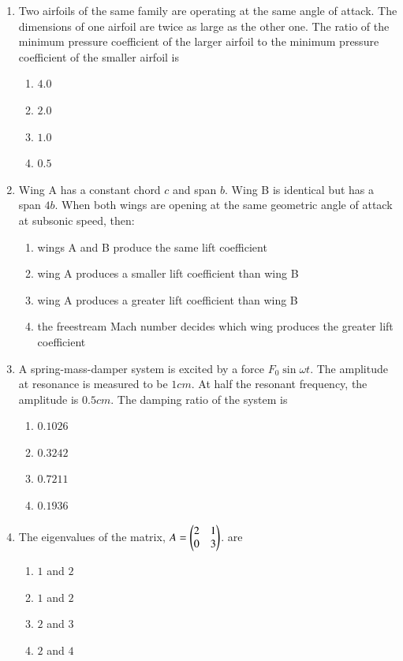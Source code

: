\documentclass[journal]{IEEEtran}
\begin{document}
\begin{enumerate}
	\item 	Two airfoils of the same family are operating at the same angle of attack. The dimensions of one airfoil are twice as large as the other one. The ratio of the minimum pressure coefficient of the larger airfoil to the minimum pressure coefficient of the smaller airfoil is
		\begin{enumerate}
			\item $4.0$
    			\item $2.0$
    			\item $1.0$
    			\item $0.5$
		\end{enumerate}


	\item Wing A has a constant chord $c$ and span $b$. Wing B is identical but has a span $4b$. When both wings are opening at the same geometric angle of attack at subsonic speed, then:
		\begin{enumerate}
			\item wings A and B produce the same lift coefficient
			\item wing A produces a smaller lift coefficient than wing B
			\item wing A produces a greater lift coefficient than wing B
			\item the freestream Mach number decides which wing produces the greater lift coefficient
		\end{enumerate}


	\item A spring-mass-damper system is excited by a force $F_0 \sin \omega t$. The amplitude at resonance is measured to be $1cm$. At half the resonant frequency, the amplitude is $0.5cm$. The damping ratio of the system is
		\begin{enumerate}
			\item $0.1026$
			\item $0.3242$
			\item $0.7211$
			\item $0.1936$
		\end{enumerate}

	\item The eigenvalues of the matrix, $A = \begin{pmatrix}2&1\\0&3\end{pmatrix}$. are
		\begin{enumerate}
			\item $1$ and $2$
			\item $1$ and $2$
			\item $2$ and $3$
			\item $2$ and $4$
		\end{enumerate}


\end{enumerate}
\end{document}
